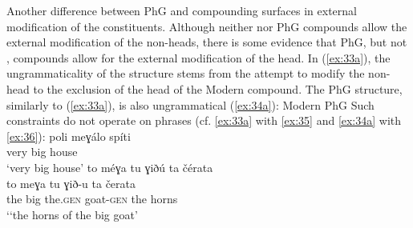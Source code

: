 \documentclass[output=paper]{LSP/langsci}
\begin{document}
Another difference between PhG and  compounding surfaces in external modification of the constituents. Although neither  nor PhG compounds allow the external modification of the non-heads, there is some evidence that PhG, but not , compounds allow for the external modification of the head. In (\ref{ex:33a}), the ungrammaticality of the structure stems from the attempt to modify the non-head to the exclusion of the head of the Modern  compound. The PhG structure, similarly to  (\ref{ex:33a}), is also ungrammatical (\ref{ex:34a}):
\ea\label{ex:33} Modern 
	\z
\z
\ea\label{ex:34} PhG
	\z
\z				
Such constraints do not operate on phrases (cf. \ref{ex:33a} with \ref{ex:35} and \ref{ex:34a} with \ref{ex:36}):
\ea\label{ex:35}
	\gll 	poli meɣálo spíti\\
			very big house\\
	\glt `very big house'
\z
\ea\label{ex:36}
	\glll to méɣa tu ɣiðú ta čérata\\
			to meɣa tu ɣið-u ta čerata\\
			the big the.\textsc{gen} goat-\textsc{gen} the horns\\
	\glt `‘the horns of the big goat’ 
\z
\end{document}
